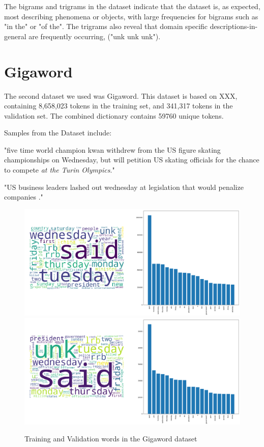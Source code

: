 \documentclass[a4paper]{article}
\begin{document}
The bigrams and trigrams in the dataset indicate that the dataset is, as expected,
most describing phenomena or objects, with large frequencies for bigrams
such as "in the" or "of the". The trigrams also reveal that domain specific
descriptions-in-general are frequently occurring, ("unk unk unk").

\section{Gigaword}
\label{sec:gigaword}

The second dataset we used was Gigaword. This dataset is based on XXX,
containing 8,658,023 tokens in the training set, and 341,317 tokens in the
validation set. The combined dictionary contains 59760 unique tokens.

Samples from the Dataset include:

"five time world champion kwan withdrew from the US figure skating championships
on Wednesday, but will petition US skating officials for the chance to compete
\emph{at the Turin Olympics}."

"US business leaders lashed out wednesday at legislation that would penalize companies
."

\begin{figure}[!ht]
\includegraphics[width=0.7\columnwidth]{sr-eda-gigaword-train-words}
\includegraphics[width=0.7\columnwidth]{sr-eda-gigaword-valid-words}
\centering
\caption{Training and Validation words in the Gigaword dataset}
\end{figure}
\end{document}
